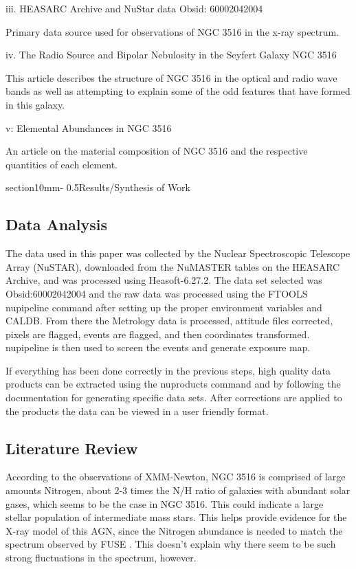 \documentclass[letterpaper,11pt,twocolumn]{article}
\makeatletter
\renewcommand{\section}{\@startsection%
{section}{1}{0mm}{-\baselineskip}%
{0.5\baselineskip}{\normalfont\Large\bfseries}}%
\makeatother
\begin{document}
iii. HEASARC Archive and NuStar data Obsid: 60002042004

Primary data source used for observations of NGC 3516 in the x-ray spectrum.

iv. The Radio Source and Bipolar Nebulosity in the Seyfert Galaxy NGC 3516

This article describes the structure of NGC 3516 in the optical and radio wave bands as well as attempting to explain some of the odd features that have formed in this galaxy.

v: Elemental Abundances in NGC 3516

An article on the material composition of NGC 3516 and the respective quantities of each element.



\section{Results/Synthesis of Work}

\subsection{Data Analysis}

The data used in this paper was collected by the Nuclear Spectroscopic Telescope Array (NuSTAR), downloaded from the NuMASTER tables on the HEASARC Archive, and was processed using Heasoft-6.27.2. The data set selected was Obsid:60002042004 and the raw data was processed using the FTOOLS nupipeline command after setting up the proper environment variables and CALDB. From there the Metrology data is processed, attitude files corrected, pixels are flagged, events are flagged, and then coordinates transformed. nupipeline is then used to screen the events and generate exposure map.

If everything has been done correctly in the previous steps, high quality data products can be extracted using the nuproducts command and by following the documentation for generating specific data sets. After corrections are applied to the products the data can be viewed in a user friendly format.

\subsection{Literature Review}

According to the observations of XMM-Newton, NGC 3516 is comprised of large amounts Nitrogen, about 2-3 times the N/H ratio of galaxies with abundant solar gases, which seems to be the case in NGC 3516. This could indicate a large stellar population of intermediate mass stars. This helps provide evidence for the X-ray model of this AGN, since the Nitrogen abundance is needed to match the spectrum observed by FUSE {\it \citet{TKM+19}}. This doesn't explain why there seem to be such strong fluctuations in the spectrum, however.
\end{document}
